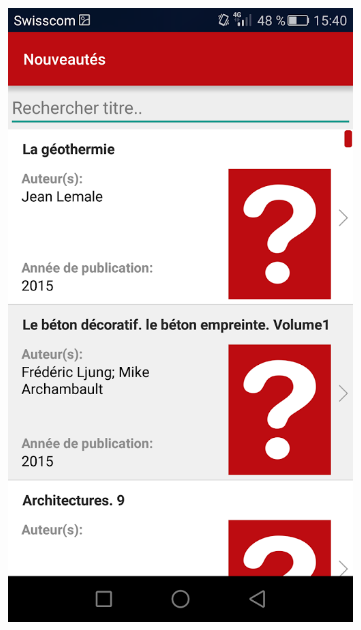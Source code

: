 \documentclass[10pt]{beamer}
\begin{document}
\begin{frame}
\begin{columns}[T]
\begin{column}{.65\textwidth}
\begin{columns}[T]
\begin{column}{.3\textwidth}
\begin{figure}
                    \end{figure}
                \end{column}
                \begin{column}{.3\textwidth}
                    \begin{figure}
                        \includegraphics[width=1\textwidth]{images/bibapp2.png}
                    \end{figure}
                \end{column}

\end{columns}
\end{column}
\end{columns}
\end{frame}
\end{document}
